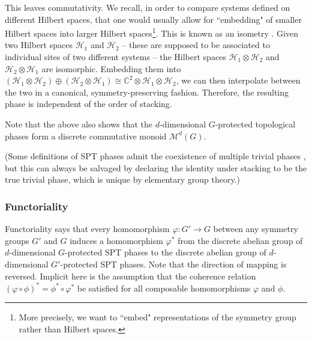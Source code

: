 \documentclass[sort&compress]{elsarticle}
\theoremstyle{theoremstyle}
\theoremstyle{framedtheoremstyle}
\theoremstyle{definitionstyle}
\theoremstyle{definitionstyle}
\theoremstyle{definitionstyle}
\theoremstyle{definitionstyle}
\theoremstyle{nameddefinitionstyle}
\theoremstyle{framednameddefinitionstyle}
\theoremstyle{proofstyle}
\theoremstyle{definitionstyle}
\newcommand{\fromto}{\rightarrow}
\newcommand{\CCC}{\mathbb{C}}
\newcommand{\M}{\mathcal{M}}
\newcommand{\isomorphic}{\cong}
\newcommand{\paren}[1]{\left( #1 \right)}
\begin{document}
This leaves commutativity. We recall, in order to compare systems defined on different Hilbert spaces, that one would usually allow for ``embedding" of smaller Hilbert spaces into larger Hilbert spaces\footnote{More precisely, we want to ``embed" representations of the symmetry group rather than Hilbert spaces.}. This is known as an isometry \cite{Vidal_1, Vidal_2, Wen_1d, Cirac}. Given two Hilbert spaces $\mathscr H_1$ and $\mathscr H_2$ -- these are supposed to be associated to individual sites of two different systems -- the Hilbert spaces $\mathscr H_1 \otimes \mathscr H_2$ and $\mathscr H_2 \otimes \mathscr H_1$ are isomorphic. Embedding them into $\paren{\mathscr H_1 \otimes \mathscr H_2} \oplus \paren{\mathscr H_2\otimes \mathscr H_1} \isomorphic \CCC^2 \otimes \mathscr H_1 \otimes \mathscr H_2$, we can then interpolate between the two in a canonical, symmetry-preserving fashion. Therefore, the resulting phase is independent of the order of stacking.

Note that the above also shows that the $d$-dimensional $G$-protected topological phases form a discrete commutative monoid $\M^d(G)$. 

(Some definitions of SPT phases admit the coexistence of multiple trivial phases \cite{SPt,Hermele_torsor}, but this can always be salvaged by declaring the identity under stacking to be the true trivial phase, which is unique by elementary group theory.)

\subsubsection{Functoriality \label{subsubsec:functoriality}}

Functoriality says that every homomorphism $\varphi: G' \fromto G$ between any symmetry groups $G'$ and $G$ induces a homomorphism $\varphi^\ast$ from the discrete abelian group of $d$-dimensional $G$-protected SPT phases to the discrete abelian group of $d$-dimensional $G'$-protected SPT phases. Note that the direction of mapping is reversed. Implicit here is the assumption that the coherence relation $(\varphi \circ \phi)^\ast = \phi^\ast \circ \varphi^\ast$ be satisfied for all composable homomorphisms $\varphi$ and $\phi$.
\end{document}
